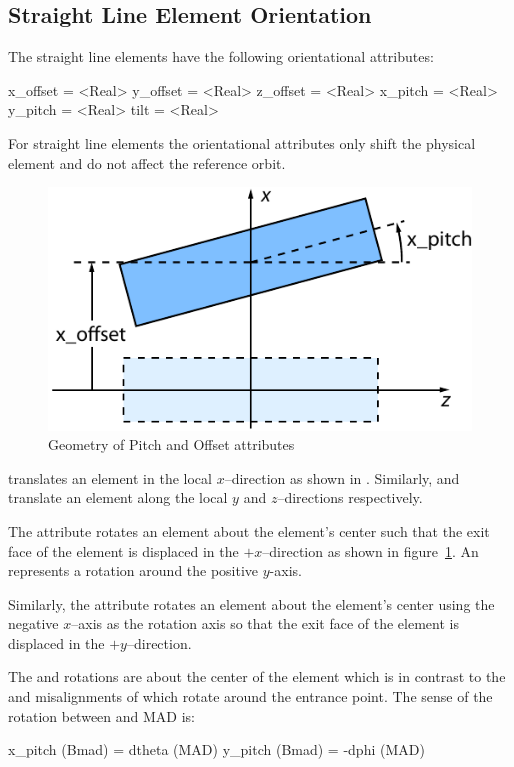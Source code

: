 \subsection{Straight Line Element Orientation}

The straight line elements have the following orientational attributes:
\begin{example}
  x_offset = <Real>
  y_offset = <Real>
  z_offset = <Real>
  x_pitch  = <Real>
  y_pitch  = <Real>
  tilt     = <Real>    
\end{example}
For straight line elements the orientational attributes only shift the
physical element and do not affect the reference orbit.

\begin{figure}[tb]
  \centering
  \includegraphics{pitch.pdf}
  \caption{Geometry of Pitch and Offset attributes}
  \label{f:pitch}
\end{figure}

 translates an element in the local $x$--direction
as shown in . Similarly,  and 
 translate an element along the local $y$ and 
$z$--directions respectively.

The  attribute rotates an element about the element's
center such that the exit face of the element is displaced in the
$+x$--direction as shown in figure~\ref{f:pitch}.  An
 represents a rotation around the positive $y$-axis.

Similarly, the  attribute rotates an element about the
element's center using the negative $x$--axis as the rotation axis so
that the exit face of the element is displaced in the $+y$--direction.

The  and  rotations are about the center of
the element which is in contrast to the  and 
misalignments of \mad which rotate around the entrance point. The
sense of the rotation between \bmad and MAD is:
\begin{example}
  x_pitch (Bmad) =  dtheta (MAD)
  y_pitch (Bmad) = -dphi (MAD)
\end{example}

